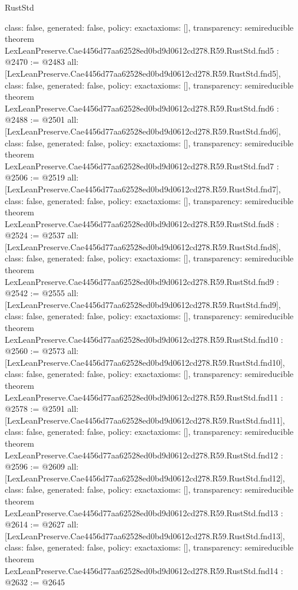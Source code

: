 \begin{lexlean}{RustStd}
\begin{coremodule}
{  class: false,
  generated: false,
  policy: exact{axioms: []},
  transparency: semireducible
}
theorem LexLeanPreserve.Cae4456d77aa62528ed0bd9d0612cd278.R59.RustStd.fnd5 : @2470 := @2483 {
  all: [LexLeanPreserve.Cae4456d77aa62528ed0bd9d0612cd278.R59.RustStd.fnd5],
  class: false,
  generated: false,
  policy: exact{axioms: []},
  transparency: semireducible
}
theorem LexLeanPreserve.Cae4456d77aa62528ed0bd9d0612cd278.R59.RustStd.fnd6 : @2488 := @2501 {
  all: [LexLeanPreserve.Cae4456d77aa62528ed0bd9d0612cd278.R59.RustStd.fnd6],
  class: false,
  generated: false,
  policy: exact{axioms: []},
  transparency: semireducible
}
theorem LexLeanPreserve.Cae4456d77aa62528ed0bd9d0612cd278.R59.RustStd.fnd7 : @2506 := @2519 {
  all: [LexLeanPreserve.Cae4456d77aa62528ed0bd9d0612cd278.R59.RustStd.fnd7],
  class: false,
  generated: false,
  policy: exact{axioms: []},
  transparency: semireducible
}
theorem LexLeanPreserve.Cae4456d77aa62528ed0bd9d0612cd278.R59.RustStd.fnd8 : @2524 := @2537 {
  all: [LexLeanPreserve.Cae4456d77aa62528ed0bd9d0612cd278.R59.RustStd.fnd8],
  class: false,
  generated: false,
  policy: exact{axioms: []},
  transparency: semireducible
}
theorem LexLeanPreserve.Cae4456d77aa62528ed0bd9d0612cd278.R59.RustStd.fnd9 : @2542 := @2555 {
  all: [LexLeanPreserve.Cae4456d77aa62528ed0bd9d0612cd278.R59.RustStd.fnd9],
  class: false,
  generated: false,
  policy: exact{axioms: []},
  transparency: semireducible
}
theorem LexLeanPreserve.Cae4456d77aa62528ed0bd9d0612cd278.R59.RustStd.fnd10 : @2560 := @2573 {
  all: [LexLeanPreserve.Cae4456d77aa62528ed0bd9d0612cd278.R59.RustStd.fnd10],
  class: false,
  generated: false,
  policy: exact{axioms: []},
  transparency: semireducible
}
theorem LexLeanPreserve.Cae4456d77aa62528ed0bd9d0612cd278.R59.RustStd.fnd11 : @2578 := @2591 {
  all: [LexLeanPreserve.Cae4456d77aa62528ed0bd9d0612cd278.R59.RustStd.fnd11],
  class: false,
  generated: false,
  policy: exact{axioms: []},
  transparency: semireducible
}
theorem LexLeanPreserve.Cae4456d77aa62528ed0bd9d0612cd278.R59.RustStd.fnd12 : @2596 := @2609 {
  all: [LexLeanPreserve.Cae4456d77aa62528ed0bd9d0612cd278.R59.RustStd.fnd12],
  class: false,
  generated: false,
  policy: exact{axioms: []},
  transparency: semireducible
}
theorem LexLeanPreserve.Cae4456d77aa62528ed0bd9d0612cd278.R59.RustStd.fnd13 : @2614 := @2627 {
  all: [LexLeanPreserve.Cae4456d77aa62528ed0bd9d0612cd278.R59.RustStd.fnd13],
  class: false,
  generated: false,
  policy: exact{axioms: []},
  transparency: semireducible
}
theorem LexLeanPreserve.Cae4456d77aa62528ed0bd9d0612cd278.R59.RustStd.fnd14 : @2632 := @2645 {
}
\end{coremodule}
\end{lexlean}
